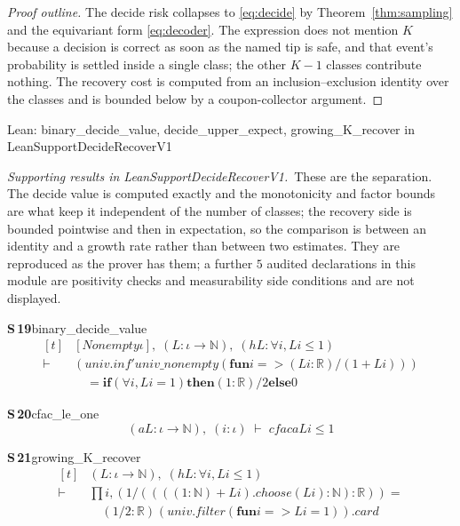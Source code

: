 \documentclass[conference]{IEEEtran}
\theoremstyle{definition}
\newcommand{\lean}[1]{\textsf{\footnotesize #1}}
\newcommand{\leanbox}[1]{%
  \par\vspace{2pt}\noindent
  {\footnotesize\textsf{Lean: #1}}\par\vspace{2pt}}
\begin{document}
\begin{proof}[Proof outline]
The decide risk collapses to \eqref{eq:decide} by Theorem~\ref{thm:sampling} and the
equivariant form \eqref{eq:decoder}. The expression does not mention $K$ because a decision is
correct as soon as the named tip is safe, and that event's probability is settled inside a
single class; the other $K-1$ classes contribute nothing. The recovery cost is computed from
an inclusion--exclusion identity over the classes and is bounded below by a coupon-collector
argument.
\end{proof}

\leanbox{\lean{binary\_decide\_value}, \lean{decide\_upper\_expect},
\lean{growing\_K\_recover} in \lean{LeanSupportDecideRecoverV1}}

\noindent\emph{Supporting results in \lean{LeanSupportDecideRecoverV1}.}~These are the separation. The decide value is computed exactly and the monotonicity and factor bounds are what keep it independent of the number of classes; the recovery side is bounded pointwise and then in expectation, so the comparison is between an identity and a growth rate rather than between two estimates. They are reproduced as the prover has them; a further $5$ audited declarations in this module are positivity checks and measurability side conditions and are not displayed.

\noindent\textbf{S\,19}\quad\lean{binary\_decide\_value}
{\footnotesize\[ \begin{aligned}[t]
&[\mathit{Nonempty} \iota ],\; (\mathit{L} : \iota \to \mathbb{N} ),\; (\mathit{hL} : \forall \mathit{i}, \mathit{L} \mathit{i} \leq 1)\\
\vdash\;&(\mathit{univ}.\mathit{inf'} \mathit{univ\_nonempty} (\mathbf{fun} \mathit{i} => (\mathit{L} \mathit{i} : \mathbb{R} ) / (1 + \mathit{L} \mathit{i})))\\
&\quad = \mathbf{if} (\forall \mathit{i}, \mathit{L} \mathit{i} = 1) \mathbf{then} (1 : \mathbb{R} ) / 2 \mathbf{else} 0
\end{aligned} \]}

\noindent\textbf{S\,20}\quad\lean{cfac\_le\_one}
{\footnotesize\[ (\mathit{a} \mathit{L} : \iota \to \mathbb{N} ),\; (\mathit{i} : \iota ) \;\vdash\; \mathit{cfac} \mathit{a} \mathit{L} \mathit{i} \leq 1 \]}

\noindent\textbf{S\,21}\quad\lean{growing\_K\_recover}
{\footnotesize\[ \begin{aligned}[t]
&(\mathit{L} : \iota \to \mathbb{N} ),\; (\mathit{hL} : \forall \mathit{i}, \mathit{L} \mathit{i} \leq 1)\\
\vdash\;&\textstyle\prod \mathit{i}, (1 / ((((1:\mathbb{N} ) + \mathit{L} \mathit{i}).\mathit{choose} (\mathit{L} \mathit{i}) : \mathbb{N} ) : \mathbb{R} )) =\\
&\quad (1 / 2 : \mathbb{R} ) ^{} (\mathit{univ}.\mathit{filter} (\mathbf{fun} \mathit{i} => \mathit{L} \mathit{i} = 1)).\mathit{card}
\end{aligned} \]}
\end{document}
